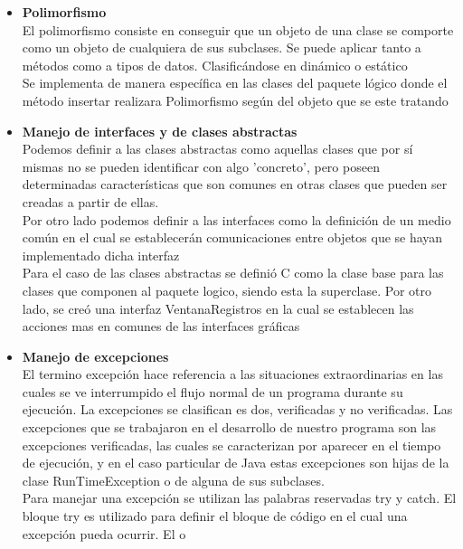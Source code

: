 \documentclass[a4paper,12pt]{article}
\begin{document}
\begin{flushleft}
\begin{itemize}
\item{\textbf{Polimorfismo}}
\vspace{0.3cm}
\textsf{\\El polimorfismo consiste en conseguir que un objeto de una clase se comporte como un objeto de cualquiera de sus subclases. Se puede aplicar tanto a métodos como a tipos de datos. Clasificándose en dinámico o estático\\\vspace{0.3cm}Se implementa de manera específica en las clases del paquete lógico donde el método insertar realizara Polimorfismo según del objeto que se este tratando}
\item{\textbf{Manejo de interfaces y de clases abstractas}}
\vspace{0.3cm}
\textsf{\\Podemos definir a las clases abstractas como aquellas clases que por sí mismas no se pueden identificar con algo 'concreto', pero poseen determinadas características que son comunes en otras clases que pueden ser creadas a partir de ellas.\\\vspace{0.3cm} Por otro lado podemos definir a las interfaces como la definición de un medio común en el cual se establecerán comunicaciones entre objetos que se hayan implementado dicha interfaz\\\vspace{0.3cm}Para el caso de las clases abstractas se definió C como la clase base para las clases que componen al paquete logico, siendo esta la superclase. Por otro lado, se creó una interfaz VentanaRegistros en la cual se establecen las acciones mas en comunes de las interfaces gráficas}
\item{\textbf{Manejo de excepciones}}
\vspace{0.3cm}
\textsf{\\El termino excepción hace referencia a las situaciones extraordinarias en las cuales se ve interrumpido el flujo normal de un programa durante su ejecución. La excepciones se clasifican es dos, verificadas y no verificadas. Las excepciones que se trabajaron en el desarrollo de nuestro programa son las excepciones verificadas, las cuales se caracterizan por aparecer en el tiempo de ejecución, y en el caso particular de Java estas excepciones son hijas de la clase RunTimeException o de alguna de sus subclases. \\\vspace{0.3cm}Para manejar una excepción se utilizan las palabras reservadas try y catch. El bloque try es utilizado para definir el bloque de código en el cual una excepción pueda ocurrir. El o
}
\end{itemize}
\end{flushleft}
\end{document}
